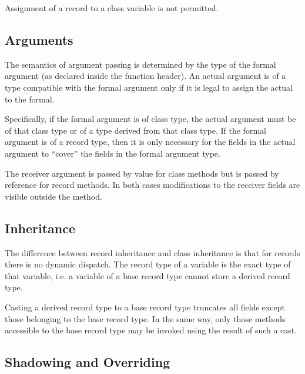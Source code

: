 Assignment of a record to a class variable is not permitted.

\subsection{Arguments}
\label{Argument_Differences}

The semantics of argument passing is determined by the type of the formal
argument (as declared inside the function header).  An actual argument is of a
type compatible with the formal argument only if it is legal to assign the
actual to the formal.

Specifically, if the formal argument is of class type, the actual argument must
be of that class type or of a type derived from that class type.  If the formal
argument is of a record type, then it is only necessary for the fields in the
actual argument to ``cover'' the fields in the formal argument type.

The receiver argument is passed by value for class methods but is
passed by reference for record methods. In both cases modifications to
the receiver fields are visible outside the method.

\subsection{Inheritance}
\label{Inheritance_Differences}

The difference between record inheritance and class
inheritance is that for records there is no dynamic dispatch.  The record type of
a variable is the exact type of that variable, i.e. a variable of a
base record type cannot store a derived record type.

Casting a derived record type to a base record type truncates all 
fields except those belonging to the base record type.  In the same way, only
those methods accessible to the base record type may be invoked using the result
of such a cast.

\subsection{Shadowing and Overriding}
\label{Base_Method_Differences}

